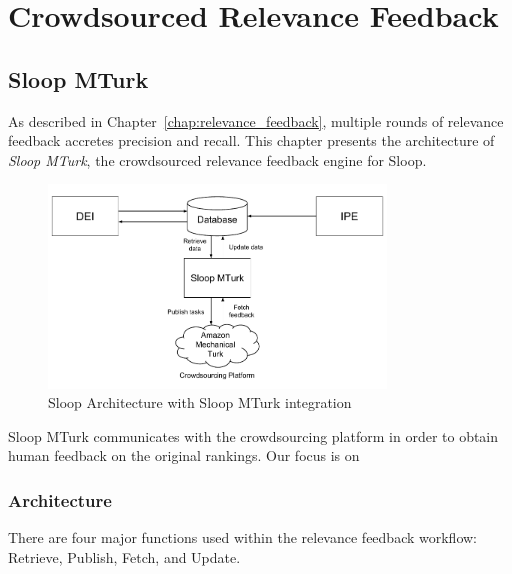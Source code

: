 \graphicspath{{./images/chap5/}}
\chapter{Crowdsourced Relevance Feedback}
\label{chap:sloop_mturk}
\section{Sloop MTurk}

As described in Chapter~\ref{chap:relevance_feedback}, multiple rounds of
relevance feedback accretes precision and recall. This
chapter presents the architecture of \emph{Sloop MTurk}, the crowdsourced
relevance feedback engine for Sloop.

\begin{figure}[htb]
  \centering
  \includegraphics[width=0.8\textwidth]{sloop/turk_system}
  \caption{Sloop Architecture with Sloop MTurk integration}
  \label{fig:turk_overview} %
\end{figure}

Sloop MTurk communicates with the crowdsourcing platform in order to obtain
human feedback on the original rankings. Our focus is on

\subsection{Architecture}

There are four major functions used within the relevance feedback
workflow: Retrieve, Publish, Fetch, and Update.

